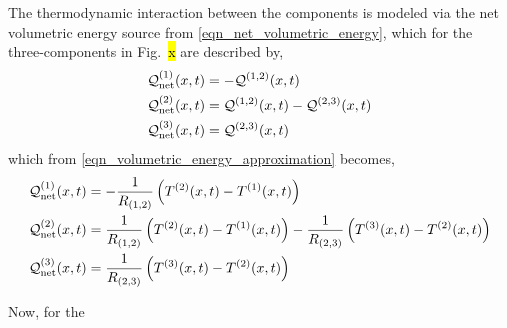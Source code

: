 The thermodynamic interaction between the components is modeled via the net volumetric energy source from \cref{eqn_net_volumetric_energy}, which for the three-components in Fig.~\hl{x} are described by,
\begin{subequations}
    \begin{align}
        \mathcal{Q}^{(1)}_{\text{net}}(x,t) &= -\mathcal{Q}^{(1,2)}(x,t)\\
        \mathcal{Q}^{(2)}_{\text{net}}(x,t) &= \mathcal{Q}^{(1,2)}(x,t) - \mathcal{Q}^{(2,3)}(x,t)\\
        \mathcal{Q}^{(3)}_{\text{net}}(x,t) &= \mathcal{Q}^{(2,3)}(x,t)
    \end{align}
\end{subequations}
which from \cref{eqn_volumetric_energy_approximation} becomes,
\begin{subequations}
    \begin{align*}
        \mathcal{Q}^{(1)}_{\text{net}}(x,t) &= -\frac{1}{R_{(1,2)}}\left(T^{(2)}(x,t) - T^{(1)}(x,t)\right)\\
        \mathcal{Q}^{(2)}_{\text{net}}(x,t) &= \frac{1}{R_{(1,2)}}\left(T^{(2)}(x,t) - T^{(1)}(x,t)\right) - \frac{1}{R_{(2,3)}}\left(T^{(3)}(x,t) - T^{(2)}(x,t)\right)\\
        \mathcal{Q}^{(3)}_{\text{net}}(x,t) &= \frac{1}{R_{(2,3)}}\left(T^{(3)}(x,t) - T^{(2)}(x,t)\right)
    \end{align*}
\end{subequations}

Now, for the 











